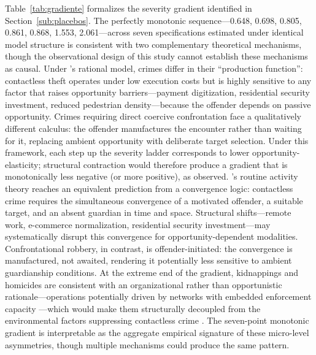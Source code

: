 \documentclass[pdflatex,sn-basic]{sn-jnl}
\begin{document}
Table~\ref{tab:gradiente} formalizes the severity gradient identified in Section~\ref{sub:placebos}. The perfectly monotonic sequence---0.648, 0.698, 0.805, 0.861, 0.868, 1.553, 2.061---across seven specifications estimated under identical model structure is consistent with two complementary theoretical mechanisms, though the observational design of this study cannot establish these mechanisms as causal. Under \citet{becker1968}'s rational model, crimes differ in their ``production function'': contactless theft operates under low execution costs but is highly sensitive to any factor that raises opportunity barriers---payment digitization, residential security investment, reduced pedestrian density---because the offender depends on passive opportunity. Crimes requiring direct coercive confrontation face a qualitatively different calculus: the offender manufactures the encounter rather than waiting for it, replacing ambient opportunity with deliberate target selection. Under this framework, each step up the severity ladder corresponds to lower opportunity-elasticity; structural contraction would therefore produce a gradient that is monotonically less negative (or more positive), as observed. \citet{cohen1979}'s routine activity theory reaches an equivalent prediction from a convergence logic: contactless crime requires the simultaneous convergence of a motivated offender, a suitable target, and an absent guardian in time and space. Structural shifts---remote work, e-commerce normalization, residential security investment---may systematically disrupt this convergence for opportunity-dependent modalities. Confrontational robbery, in contrast, is offender-initiated: the convergence is manufactured, not awaited, rendering it potentially less sensitive to ambient guardianship conditions. At the extreme end of the gradient, kidnappings and homicides are consistent with an organizational rather than opportunistic rationale---operations potentially driven by networks with embedded enforcement capacity \citep{dammert2025,greene2023}---which would make them structurally decoupled from the environmental factors suppressing contactless crime \citep[see also][for evidence of crime persistence via lagged effects across offense types]{buonanno2008}. The seven-point monotonic gradient is interpretable as the aggregate empirical signature of these micro-level asymmetries, though multiple mechanisms could produce the same pattern.
\end{document}
